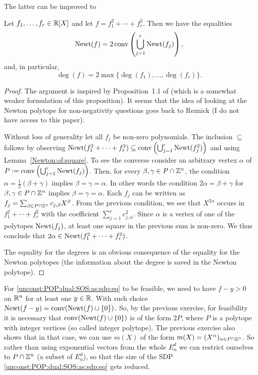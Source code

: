 The latter can be improved to

\begin{proposition} \label{newton:SOS}
	Let $f_1,\ldots,f_r \in \mathbb{R}[X]$ and let $f=f_1^2 + \cdots + f_r^2$. Then we have the equalities 
	\[
		\operatorname{Newt}(f) = 2 \operatorname{conv} \left( \bigcup_{j=1}^r \operatorname{Newt}(f_j) \right),
	\]
	and, in particular, 
	\[
		\deg(f) = 2 \max \{\deg(f_1),\ldots,\deg(f_r)\}. 
	\]
\end{proposition} 
\begin{proof}
	The argument is inspired by Proposition~1.1 of \cite{chua2016gram} (which is a somewhat weaker formulation of this proposition). It seems that the idea of looking at the Newton polytope for non-negativity questions goes back to Reznick \cite{Reznick1978} (I do not have access to this paper). 
	
	Without loss of generality let all $f_j$ be non-zero polynomials. The inclusion $\subseteq$ follows by observing $\operatorname{Newt}(f_1^2 + \cdots + f_r^2) \subseteq \operatorname{conv} \left(\bigcup_{j=1}^r \operatorname{Newt}(f_j^2) \right)$ and using Lemma~\ref{Newton:of:square}. To see the converse consider an arbitrary vertex $\alpha$ of $P:=\operatorname{conv} \left( \bigcup_{j=1}^r \operatorname{Newt}(f_j) \right)$. Then, for every $\beta,\gamma \in P \cap \mathbb{Z}^n$, the condition $\alpha = \frac{1}{2}(\beta + \gamma)$ implies $\beta = \gamma = \alpha$.  In other words the condition $2 \alpha = \beta+ \gamma$ for $\beta, \gamma \in P \cap \mathbb{Z}^n$ implies $\beta=\gamma =\alpha$. Each $f_j$ can be written as $f_j = \sum_{\beta \in P \cap \mathbb{Z}^n} c_{j,\beta} X^\beta$. From the previous condition, we see that $X^{2 \alpha}$ occurs in $f_1^2 + \cdots + f_r^2$ with the coefficient $\sum_{j=1}^r c_{j,\alpha}^2$. Since $\alpha$ is a vertex of one of the polytopes $\operatorname{Newt}(f_j)$, at least one square in the previous sum is non-zero. We thus conclude that $2 \alpha \in \operatorname{Newt}(f_1^2 + \cdots +f_r^2)$. 
	
	The equality for the degrees is an obvious consequence of the equality for the Newton polytopes (the information about the degree is saved in the Newton polytope). 
\end{proof}

For \eqref{unconst:POP:dual:SOS:as:sdp:eq} to be feasible, we need to have $f - y>0$ on $\mathbb{R}^n$ for at least one $y \in \mathbb{R}$. With such choice $\operatorname{Newt}(f-y) = \operatorname{conv}(\operatorname{Newt}(f) \cup \{0\})$. So, by the previous exercise,  for feasibility it is necessary that $\operatorname{conv}(\operatorname{Newt}(f) \cup \{0\})$ is of the form $2 P$, where $P$ is a polytope with integer vertices (so called integer polytope). The previous exercise also shows that in that case, we can use $m(X)$ of the form $m(X) = (X^\alpha)_{\alpha \in P \cap \mathbb{Z}^n}$. So rather than using exponential vectors from the whole $E_n^d$ we can restrict ourselves to $P \cap \mathbb{Z}^n$ (a subset of $E_n^d$), so that the size of the SDP \eqref{unconst:POP:dual:SOS:as:sdp:eq} gets reduced. 

